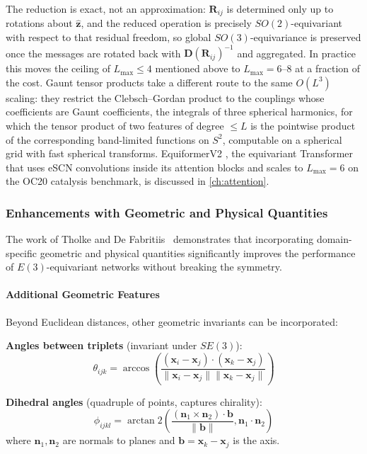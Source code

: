 The reduction is exact, not an approximation: $\mathbf{R}_{ij}$ is determined only up to rotations about $\hat{\mathbf{z}}$, and the reduced operation is precisely $SO(2)$-equivariant with respect to that residual freedom, so global $SO(3)$-equivariance is preserved once the messages are rotated back with $\mathbf{D}(\mathbf{R}_{ij})^{-1}$ and aggregated. In practice this moves the ceiling of $L_{\max} \le 4$ mentioned above to $L_{\max} = 6$--$8$ at a fraction of the cost. Gaunt tensor products \citep{luo2024gaunt} take a different route to the same $O(L^3)$ scaling: they restrict the Clebsch--Gordan product to the couplings whose coefficients are Gaunt coefficients, the integrals of three spherical harmonics, for which the tensor product of two features of degree $\le L$ is the pointwise product of the corresponding band-limited functions on $S^2$, computable on a spherical grid with fast spherical transforms. EquiformerV2 \citep{liao2024equiformerv2}, the equivariant \gls{Transformer} that uses eSCN convolutions inside its attention blocks and scales to $L_{\max} = 6$ on the OC20 catalysis benchmark, is discussed in \autoref{ch:attention}.

\subsubsection{Enhancements with Geometric and Physical Quantities}

The work of Tholke and De Fabritiis~\citep{tholke2022geometric} demonstrates that incorporating domain-specific geometric and physical quantities significantly improves the performance of $E(3)$-equivariant networks without breaking the symmetry.

\paragraph{Additional Geometric Features}

Beyond Euclidean distances, other geometric invariants can be incorporated:

\textbf{Angles between triplets} (invariant under $SE(3)$):
\begin{equation}
\theta_{ijk} = \arccos\left(\frac{(\mathbf{x}_i - \mathbf{x}_j) \cdot (\mathbf{x}_k - \mathbf{x}_j)}{\|\mathbf{x}_i - \mathbf{x}_j\| \|\mathbf{x}_k - \mathbf{x}_j\|}\right)
\end{equation}

\textbf{Dihedral angles} (quadruple of points, captures chirality):
\begin{equation}
\phi_{ijkl} = \arctan2\left(\frac{(\mathbf{n}_1 \times \mathbf{n}_2) \cdot \mathbf{b}}{\|\mathbf{b}\|}, \mathbf{n}_1 \cdot \mathbf{n}_2\right)
\end{equation}
where $\mathbf{n}_1, \mathbf{n}_2$ are normals to planes and $\mathbf{b} = \mathbf{x}_k - \mathbf{x}_j$ is the axis.

